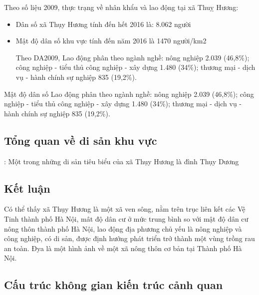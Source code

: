 \documentclass[../thesis.tex]{subfiles}
\begin{document}
Theo số liệu 2009, thực trạng về nhân khẩu và lao động tại xã Thuỵ Hương:
\begin{itemize}
    \item Dân số xã Thụy Hương tính đến hết 2016 là: 8.062 người
    \item Mật độ dân số khu vực tính đến năm 2016 là 1470 người/km2

Theo DA2009, Lao động phân theo ngành nghề: nông nghiệp 2.039 (46,8\%); công nghiệp - tiểu thủ công nghiệp - xây dựng 1.480 (34\%); thương mại - dịch vụ - hành chính sự nghiệp 835 (19,2\%).

\end{itemize}
Mật độ dân số 
Lao động phân theo ngành nghề: nông nghiệp 2.039 (46,8\%); công nghiệp - tiểu thủ công nghiệp - xây dựng 1.480 (34\%); thương mại - dịch vụ - hành chính sự nghiệp 835 (19,2\%).

\subsection{Tổng quan về di sản khu vực}:
Một trong những di sản tiêu biểu của xã Thụy Hương là đình Thụy Dương

\subsection{Kết luận}
Có thể thấy xã Thụy Hương là một xã ven sông, nằm trên trục liên kết các Vệ Tinh thành phố Hà Nội, mât độ dân cư ở mức trung bình so với mật độ dân cư nông thôn thành phố Hà Nội, lao động địa phương chủ yếu là nông nghiệp và công nghiệp, có di sản, được định hướng phát triển trở thành một vùng trồng rau an toàn. Đya là một hình ảnh về một xã nông thôn cơ bản tại Thành phố Hà Nội.

\subsection {Cấu trúc không gian kiến trúc cảnh quan}
\end{document}
